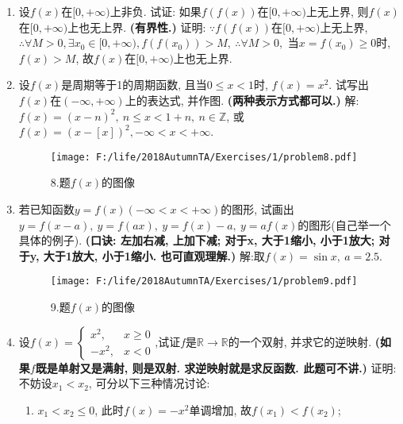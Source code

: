 \documentclass[12pt,UTF8]{ctexart}
\begin{document}
\begin{enumerate}
\item[\bf7.]设$f(x)$在$[0,+\infty)$上非负. 试证: 如果$f(f(x))$在$[0,+\infty)$上无上界, 则$f(x)$在$[0,+\infty)$上也无上界.
\newline
{\bf(有界性.)}
\newline
证明: $\because f(f(x))$在$[0,+\infty)$上无上界, $\therefore\forall M>0,\exists x_0\in[0,+\infty),f(f(x_0))>M,\ \therefore\forall M>0,$ 当$x=f(x_0)\geq0$时, $f(x)>M$, 故$f(x)$在$[0,+\infty)$上也无上界.
\item[\bf8.] 设$f(x)$是周期等于1的周期函数, 且当$0\leq x<1$时, $f(x)=x^2$. 试写出$f(x)$在$(-\infty,+\infty)$上的表达式, 并作图.
\newline
{\bf(两种表示方式都可以.)}
\newline
解: $f(x)=(x-n)^2,\ n\leq x<1+n,\ n\in\mathbb Z$, 或$f(x)=(x-[x])^2, -\infty<x<+\infty$.
\begin{figure}[H]
\begin{center}
\texttt{[image: F:/life/2018AutumnTA/Exercises/1/problem8.pdf]}
\end{center}
\caption{8.题$f(x)$的图像}
\end{figure}
\item[\bf9.]若已知函数$y=f(x)(-\infty<x<+\infty)$的图形, 试画出$y=f(x-a),\ y=f(ax),\ y=f(x)-a,\ y=af(x)$的图形(自己举一个具体的例子).
\newline
{\bf(口诀: 左加右减, 上加下减; 对于x, 大于1缩小, 小于1放大;  对于y, 大于1放大, 小于1缩小. 也可直观理解.)}
\newline
解:取$f(x)=\sin x,\ a=2.5$.
\begin{figure}[H]
\begin{center}
\texttt{[image: F:/life/2018AutumnTA/Exercises/1/problem9.pdf]}
\end{center}
\caption{9.题$f(x)$的图像}
\end{figure}
\item[10.]设$f(x)=\begin{cases}x^2,&x\geq0\\-x^2,&x<0\end{cases}$,试证$f$是$\mathbb R\rightarrow\mathbb R$的一个双射, 并求它的逆映射.
\newline
{\bf(如果$f$既是单射又是满射, 则是双射. 求逆映射就是求反函数. 此题可不讲.)}
\newline
证明: 不妨设$x_1<x_2$, 可分以下三种情况讨论:
\begin{enumerate}
\item[i.]$x_1<x_2\leq0$, 此时$f(x)=-x^2$单调增加, 故$f(x_1)<f(x_2)$;

\end{enumerate}
\end{enumerate}
\end{document}

